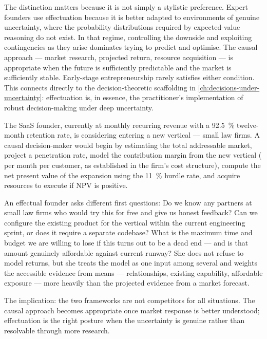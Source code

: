 The distinction matters because it is not simply a stylistic preference. Expert founders use
effectuation because it is better adapted to environments of genuine uncertainty, where the
probability distributions required by expected-value reasoning do not exist. In that regime,
controlling the downside and exploiting contingencies as they arise dominates trying to predict
and optimise. The causal approach --- market research, projected return, resource acquisition ---
is appropriate when the future is sufficiently predictable and the market is sufficiently stable.
Early-stage entrepreneurship rarely satisfies either condition. This connects directly to the
decision-theoretic scaffolding in \cref{ch:decisions-under-uncertainty}: effectuation is, in
essence, the practitioner's implementation of robust decision-making under deep uncertainty.

\begin{example}
The SaaS founder, currently at  monthly recurring revenue with a
\qty{92.5}{\percent} twelve-month retention rate, is considering entering a new vertical ---
small law firms. A causal decision-maker would begin by estimating the total addressable market,
project a penetration rate, model the contribution margin from the new vertical ( per
month per customer, as established in the firm's cost structure), compute the net present value
of the expansion using the \qty{11}{\percent} hurdle rate, and acquire resources to execute if
NPV is positive.

An effectual founder asks different first questions: Do we know any partners at small law firms
who would try this for free and give us honest feedback? Can we configure the existing product
for the vertical within the current engineering sprint, or does it require a separate codebase?
What is the maximum time and budget we are willing to lose if this turns out to be a dead end ---
and is that amount genuinely affordable against current runway? She does not refuse to model
returns, but she treats the model as one input among several and weights the accessible evidence
from means --- relationships, existing capability, affordable exposure --- more heavily than the
projected evidence from a market forecast.

The implication: the two frameworks are not competitors for all situations. The causal approach
becomes appropriate once market response is better understood; effectuation is the right posture
when the uncertainty is genuine rather than resolvable through more research.
\end{example}


